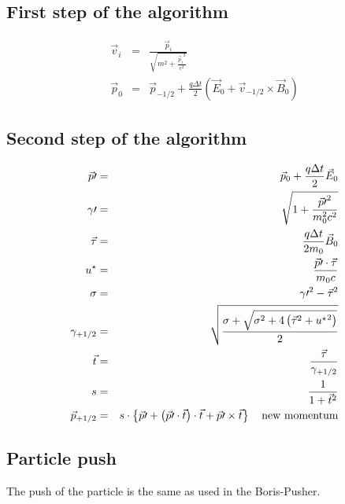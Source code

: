 \documentclass[a4paper,12pt]{article}
\begin{document}
\subsection{First step of the algorithm}
\begin{eqnarray}
\vec v_{i} & = & \frac{\vec p_{i}}{\sqrt{m^2 + \frac{{\vec p_i}^2}{c^2}}} \\
\vec p_{0} & = & \vec p_{-1/2} + \frac{q \Delta t}{2} \left(  \vec E_{0} + \vec v_{-1/2} \times \vec B_{0} \right)
\end{eqnarray}

\subsection{Second step of the algorithm}
\begin{eqnarray}
\vec p \prime  & = & \vec p_{0} + \frac{q \Delta t}{2} \vec E_{0} \\
\gamma \prime & = & \sqrt{1 + \frac{{\vec p \prime}^2}{m_0^2 c^2 }} \\
\vec \tau & = & \frac{q \Delta t}{2 m_0} \vec B_{0} \\
u^{\star} & = & \frac{\vec p \prime \cdot \vec \tau}{m_0 c} \\ 
\sigma & = & {\gamma \prime }^2 - {\vec \tau}^2 \\
\gamma_{+1/2} & = & \sqrt{\frac{  \sigma + \sqrt{  \sigma^2 + 4 \left( {\vec \tau}^2 + {u^\star}^2 \right) } }{2}} \\
\vec t & = & \frac{\vec \tau}{\gamma_{+1/2}} \\
s & = & \frac{1}{1 + \vec t^2} \\
\vec p_{+1/2} & = & s \cdot \left\{   \vec p \prime + \left( \vec p \prime \cdot \vec t  \right) \cdot \vec t   + \vec p \prime \times \vec t  \right\} \mbox{\quad  new momentum}
\end{eqnarray}

\subsection{Particle push}
The push of the particle is the same as used in the Boris-Pusher.
\end{document}
